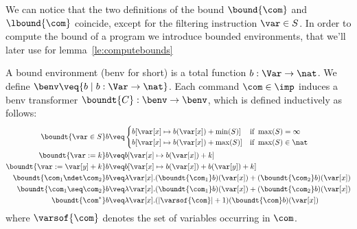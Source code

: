 We can notice that the two definitions of the bound \(\bound{\com}\)
and \(\lbound{\com}\) coincide, except for the filtering instruction
\(\var\in S\).  In order to compute the bound of a program we
introduce bounded environments, that we'll later use for
lemma~\ref{le:computebounds}

\begin{definition}
  \label{de:boundenv}
  A bound environment (benv for short) is a total function \(b:\Var
  \to \nat\). We define \(\benv \veq \{ b \mid b:\Var \to \nat\}\).
  Each command \(\com\in \imp\) induces a benv transformer
  \(\boundt{C}:\benv \to \benv\), which is defined inductively as
  follows:
  \begin{align*}
    \boundt{\var \in S}b  
    & \veq 
    \begin{cases} 
      b[\var[x]\mapsto b(\var[x])+\min(S)]& \text{if }\max(S)=\infty\\
      b[\var[x]\mapsto b(\var[x])+\max(S)]& \text{if }\max(S)\in \nat
    \end{cases}
    \\
    \boundt{\var := k}b 
    & \veq  b[\var[x]\mapsto b(\var[x])+k]\\
    \boundt{\var := \var[y] + k}b
    & \veq  b[\var[x]\mapsto b(\var[x])+b(\var[y])+k]\\
    \boundt{\com_1 \ndet \com_2}b
    & \veq \lambda \var[x]. (\boundt{\com_1}b)(\var[x]) + (\boundt{\com_2}b)(\var[x])\\
    \boundt{\com_1 \seq \com_2}b
    & \veq \lambda \var[x]. (\boundt{\com_1}b)(\var[x]) + (\boundt{\com_2}b)(\var[x])\\
    \boundt{\com^*}b
    &\veq  \lambda \var[x]. (|\varsof{\com}|+1)(\boundt{\com}b)(\var[x])
  \end{align*}    
  where \(\varsof{\com}\) denotes the set of variables occurring
  in \(\com\).
\end{definition}

